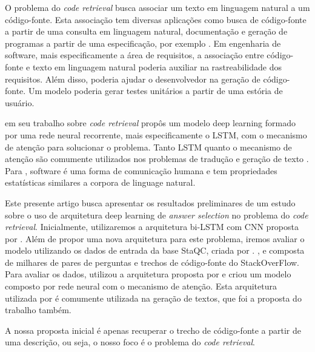 \documentclass[12pt]{article}
\begin{document}
O problema do \textit{code retrieval} busca associar um texto em linguagem natural a um código-fonte. Esta associação tem diversas aplicações como busca de código-fonte a partir de uma consulta em linguagem natural, documentação e geração de programas a partir de uma especificação, por exemplo \cite{Allamanis:2018:SML}. Em engenharia de software, mais especificamente a área de requisitos, a associação entre código-fonte e texto em linguagem natural poderia auxiliar na rastreabilidade dos requisitos. Além disso, poderia ajudar o desenvolvedor na geração de código-fonte. Um modelo poderia gerar testes unitários a partir de uma estória de usuário.

\cite{iyer-etal-2016-summarizing} em seu trabalho sobre \textit{code retrieval} propôs um modelo deep learning formado por uma rede neural recorrente, mais especificamente o LSTM, com o mecanismo de atenção para solucionar o problema. Tanto LSTM quanto o mecanismo de atenção são comumente utilizados nos problemas de tradução e geração de texto \cite{bahdanau2014neural, rush-etal-2015-neural}. Para \cite{Allamanis:2018:SML}, software é uma forma de comunicação humana e tem propriedades estatísticas similares a corpora de linguage natural. 

Este presente artigo busca apresentar os resultados preliminares de um estudo sobre o uso de arquitetura deep learning de \textit{answer selection} no problema do \textit{code retrieval}. Inicialmente, utilizaremos a arquitetura bi-LSTM com CNN proposta por \cite{tan-lstm-qa}. Além de propor uma nova arquitetura para este problema, iremos avaliar o modelo utilizando os dados de entrada da base StaQC, criada por \cite{Yao-staqc:2018}. \cite{Yao-staqc:2018}, e composta de milhares de pares de perguntas e trechos de código-fonte do StackOverFlow. Para avaliar os dados, \cite{Yao-staqc:2018} utilizou a arquitetura proposta por \cite{iyer-etal-2016-summarizing} e criou um modelo composto por rede neural com o mecanismo de atenção. Esta arquitetura utilizada por \cite{iyer-etal-2016-summarizing} é comumente utilizada na geração de textos, que foi a proposta do trabalho também. 

 A nossa proposta inicial é apenas recuperar o trecho de código-fonte a partir de uma descrição, ou seja, o nosso foco é o problema do \textit{code retrieval}.



\end{document}
